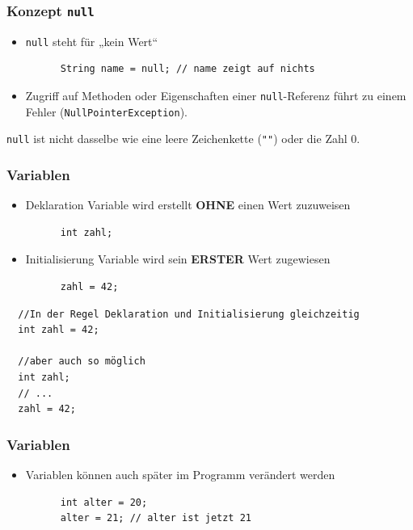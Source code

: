 \documentclass{../../presentation}
\begin{document}
\begin{frame}[fragile]
  \frametitle{Konzept \texttt{null}}
  \pause
  \begin{itemize}
    \item \texttt{null} steht für „kein Wert“
          \begin{verbatim}
      String name = null; // name zeigt auf nichts
      \end{verbatim}
          \pause
    \item Zugriff auf Methoden oder Eigenschaften einer \texttt{null}-Referenz führt zu einem Fehler (\color{red}\texttt{NullPointerException}).
  \end{itemize}
  \pause
  \achtung{} \texttt{null} ist nicht dasselbe wie eine leere Zeichenkette (\texttt{""}) oder die Zahl 0.
\end{frame}

\begin{frame}[fragile]
  \frametitle{Variablen}
  \pause
  \begin{itemize}
    \item Deklaration \quad \textrightarrow \quad Variable wird erstellt \textbf{OHNE} einen Wert zuzuweisen
          \begin{verbatim}
      int zahl;
    \end{verbatim}
          \pause
    \item Initialisierung \quad \textrightarrow \quad Variable wird sein \textbf{ERSTER} Wert zugewiesen
          \begin{verbatim}
      zahl = 42;
    \end{verbatim}
          \pause
  \end{itemize}
  \begin{verbatim}
  //In der Regel Deklaration und Initialisierung gleichzeitig
  int zahl = 42;

  //aber auch so möglich
  int zahl;
  // ...
  zahl = 42;
  \end{verbatim}
\end{frame}

\begin{frame}[fragile]
  \frametitle{Variablen}
  \pause
  \begin{itemize}
    \item Variablen können auch später im Programm verändert werden
          \begin{verbatim}
      int alter = 20;
      alter = 21; // alter ist jetzt 21
    \end{verbatim}
  \end{itemize}
\end{frame}
\end{document}
